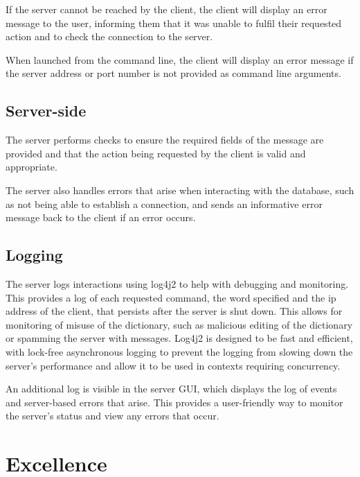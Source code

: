 \documentclass{article}
\begin{document}
If the server cannot be reached by the client, the client will display an error message to the user, informing them that it was unable to fulfil their requested action and to check the connection to the server.

When launched from the command line, the client will display an error message if the server address or port number is not provided as command line arguments.

\subsection*{Server-side}
The server performs checks to ensure the required fields of the message are provided and that the action being requested by the client is valid and appropriate. 

The server also handles errors that arise when interacting with the database, such as not being able to establish a connection, and sends an informative error message back to the client if an error occurs.

\subsection*{Logging}
The server logs interactions using log4j2 \cite{apache-log4j} to help with debugging and monitoring. This provides a log of each requested command, the word specified and the ip address of the client, that persists after the server is shut down. This allows for monitoring of misuse of the dictionary, such as malicious editing of the dictionary or spamming the server with messages. Log4j2 is designed to be fast and efficient, with lock-free asynchronous logging to prevent the logging from slowing down the server's performance and allow it to be used in contexts requiring concurrency.

An additional log is visible in the server GUI, which displays the log of events and server-based errors that arise. This provides a user-friendly way to monitor the server's status and view any errors that occur.

\section*{Excellence}
\end{document}
